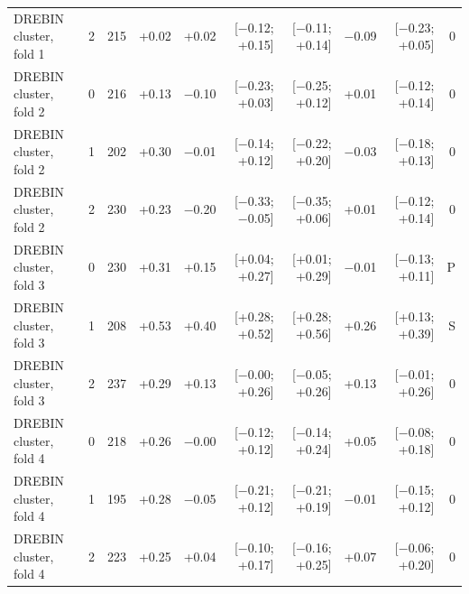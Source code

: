 \begin{table}[t]
\begin{tabular}{lrrrrrrrrr}
DREBIN cluster, fold 1 & 2 & 215 & +0.02 & +0.02 & [$-$0.12; +0.15] & [$-$0.11; +0.14] & $-$0.09 & [$-$0.23; +0.05] & 0 \\
DREBIN cluster, fold 2 & 0 & 216 & +0.13 & $-$0.10 & [$-$0.23; +0.03] & [$-$0.25; +0.12] & +0.01 & [$-$0.12; +0.14] & 0 \\
DREBIN cluster, fold 2 & 1 & 202 & +0.30 & $-$0.01 & [$-$0.14; +0.12] & [$-$0.22; +0.20] & $-$0.03 & [$-$0.18; +0.13] & 0 \\
DREBIN cluster, fold 2 & 2 & 230 & +0.23 & $-$0.20 & [$-$0.33; $-$0.05] & [$-$0.35; +0.06] & +0.01 & [$-$0.12; +0.14] & 0 \\
DREBIN cluster, fold 3 & 0 & 230 & +0.31 & +0.15 & [+0.04; +0.27] & [+0.01; +0.29] & $-$0.01 & [$-$0.13; +0.11] & P \\
DREBIN cluster, fold 3 & 1 & 208 & +0.53 & +0.40 & [+0.28; +0.52] & [+0.28; +0.56] & +0.26 & [+0.13; +0.39] & S \\
DREBIN cluster, fold 3 & 2 & 237 & +0.29 & +0.13 & [$-$0.00; +0.26] & [$-$0.05; +0.26] & +0.13 & [$-$0.01; +0.26] & 0 \\
DREBIN cluster, fold 4 & 0 & 218 & +0.26 & $-$0.00 & [$-$0.12; +0.12] & [$-$0.14; +0.24] & +0.05 & [$-$0.08; +0.18] & 0 \\
DREBIN cluster, fold 4 & 1 & 195 & +0.28 & $-$0.05 & [$-$0.21; +0.12] & [$-$0.21; +0.19] & $-$0.01 & [$-$0.15; +0.12] & 0 \\
DREBIN cluster, fold 4 & 2 & 223 & +0.25 & +0.04 & [$-$0.10; +0.17] & [$-$0.16; +0.25] & +0.07 & [$-$0.06; +0.20] & 0 \\
\bottomrule
\end{tabular}
\end{table}
